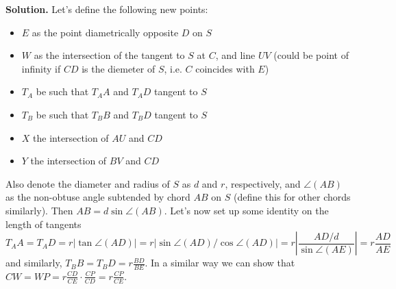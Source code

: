 \documentclass[11pt,a4paper]{article}
\begin{document}
\begin{enumerate}
	\textbf{Solution.}
	    Let's define the following new points: 
	    \begin{itemize}
	    	\item $E$ as the point diametrically opposite $D$ on $S$
	    	
	    	\item $W$ as the intersection of the tangent to $S$ at $C$, and line $UV$  (could be point of infinity if $CD$ is the diemeter of $S$, i.e. $C$ coincides with $E$)
	    	
	    	\item $T_A$ be such that $T_AA$ and $T_AD$ tangent to $S$
	    	
	    	\item $T_B$ be such that $T_BB$ and $T_BD$ tangent to $S$
	    	
	    	\item $X$ the intersection of $AU$ and $CD$
	    	
	    	\item $Y$ the intersection of $BV$ and $CD$
	    \end{itemize}
        Also denote the diameter and radius of $S$ as $d$ and $r$, respectively, 
        and $\angle(AB)$ as the non-obtuse angle subtended by chord $AB$ on $S$
        (define this for other chords similarly). 
        Then $AB=d\sin\angle (AB)$. 
        Let's now set up some identity on the length of tangents
        \[
        T_AA=T_AD = r|\tan \angle(AD)|
        =r|\sin\angle (AD) / \cos\angle(AD)|
        =r|\frac{AD/d}{\sin\angle (AE)}|
        =r\frac{AD}{AE}
        \]
        and similarly, $T_BB=T_BD=r\frac{BD}{BE}$. 
        In a similar way we can show that $CW=WP=r\frac{CD}{CE}\cdot \frac{CP}{CD}=r\frac{CP}{CE}$. 
        

\end{enumerate}
\end{document}
